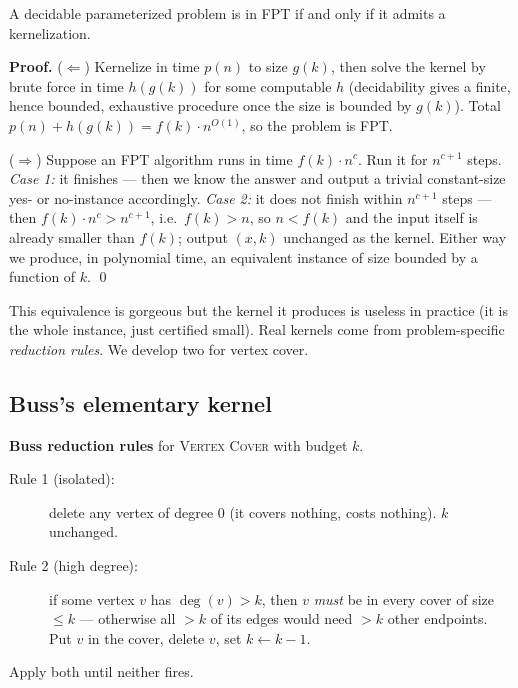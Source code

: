 \begin{theorem}\label{ch25:thm-kernel-iff}
A decidable parameterized problem is in FPT if and only if it admits a kernelization.
\end{theorem}

\begin{whybox}
\textbf{Proof.} ($\Leftarrow$) Kernelize in time $p(n)$ to size $g(k)$, then solve the kernel by brute force in time $h(g(k))$ for some computable $h$ (decidability gives a finite, hence bounded, exhaustive procedure once the size is bounded by $g(k)$). Total $p(n)+h(g(k)) = f(k)\cdot n^{O(1)}$, so the problem is FPT.

($\Rightarrow$) Suppose an FPT algorithm runs in time $f(k)\cdot n^c$. Run it for $n^{c+1}$ steps. \emph{Case 1:} it finishes --- then we know the answer and output a trivial constant-size yes- or no-instance accordingly. \emph{Case 2:} it does not finish within $n^{c+1}$ steps --- then $f(k)\cdot n^c > n^{c+1}$, i.e.\ $f(k) > n$, so $n < f(k)$ and the input itself is already smaller than $f(k)$; output $(x,k)$ unchanged as the kernel. Either way we produce, in polynomial time, an equivalent instance of size bounded by a function of $k$. \qed
\end{whybox}

This equivalence is gorgeous but the kernel it produces is useless in practice (it is the whole instance, just certified small). Real kernels come from problem-specific \emph{reduction rules}. We develop two for vertex cover.

\subsection{Buss's elementary kernel}

\begin{focusbox}
\textbf{Buss reduction rules} for \textsc{Vertex Cover} with budget $k$.
\begin{description}
  \item[Rule 1 (isolated):] delete any vertex of degree $0$ (it covers nothing, costs nothing). $k$ unchanged.
  \item[Rule 2 (high degree):] if some vertex $v$ has $\deg(v) > k$, then $v$ \emph{must} be in every cover of size $\le k$ --- otherwise all $>k$ of its edges would need $>k$ other endpoints. Put $v$ in the cover, delete $v$, set $k \gets k-1$.
\end{description}
Apply both until neither fires.
\end{focusbox}

